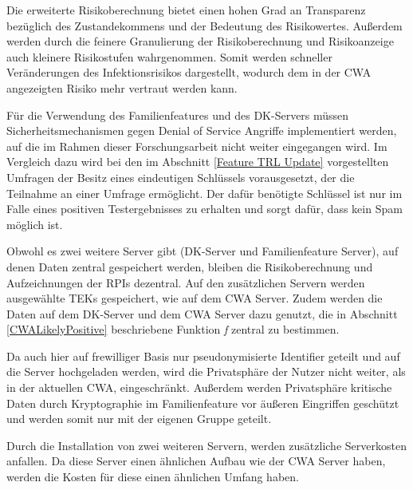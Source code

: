 \documentclass[conference,compsoc]{IEEEtran}
\begin{document}
Die erweiterte Risikoberechnung bietet einen hohen Grad an Transparenz bezüglich des Zustandekommens und der Bedeutung des Risikowertes. 
Außerdem werden durch die feinere Granulierung der Risikoberechnung und Risikoanzeige auch kleinere Risikostufen wahrgenommen. 
Somit werden schneller Veränderungen des Infektionsrisikos dargestellt, wodurch dem in der CWA angezeigten Risiko mehr vertraut werden kann.

Für die Verwendung des Familienfeatures und des DK-Servers müssen Sicherheitsmechanismen gegen Denial of Service Angriffe implementiert werden, 
auf die im Rahmen dieser Forschungsarbeit nicht weiter eingegangen wird.
Im Vergleich dazu wird bei den im Abschnitt \ref{Feature TRL Update} vorgestellten Umfragen der Besitz eines eindeutigen Schlüssels vorausgesetzt,
der die Teilnahme an einer Umfrage ermöglicht. Der dafür benötigte Schlüssel ist nur im Falle eines positiven Testergebnisses zu erhalten und sorgt dafür, dass kein Spam möglich ist.

Obwohl es zwei weitere Server gibt (DK-Server und Familienfeature Server), auf denen Daten zentral gespeichert werden, bleiben die Risikoberechnung und Aufzeichnungen der RPIs dezentral. 
Auf den zusätzlichen Servern werden ausgewählte TEKs gespeichert, wie auf dem CWA Server. 
Zudem werden die Daten auf dem DK-Server und dem CWA Server dazu genutzt, die in Abschnitt \ref{CWALikelyPositive} beschriebene Funktion \textit{f} zentral zu bestimmen.

Da auch hier auf frewilliger Basis nur pseudonymisierte Identifier geteilt und auf die Server hochgeladen werden, wird die Privatsphäre der Nutzer nicht weiter, als in der aktuellen CWA, eingeschränkt.
Außerdem werden Privatsphäre kritische Daten durch Kryptographie im Familienfeature vor äußeren Eingriffen geschützt und werden somit nur mit der eigenen Gruppe geteilt.

Durch die Installation von zwei weiteren Servern, werden zusätzliche Serverkosten anfallen. Da diese Server einen ähnlichen Aufbau wie der CWA Server haben, 
werden die Kosten für diese einen ähnlichen Umfang haben. 
\end{document}
